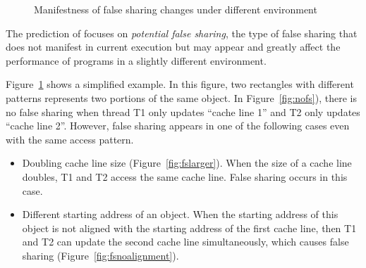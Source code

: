 \begin{figure}
\begin{center} 
%
\hspace{30pt}
%
\hspace{30pt}
%
\end{center}
\caption{Manifestness of false sharing changes under different environment}
\label{fig:potentialfalsesharing}
\end{figure}
The prediction of  focuses on {\it potential false sharing}, the type of
false sharing that does not 
manifest in current execution but may appear and greatly affect the performance of programs
in a slightly different environment.

Figure~\ref{fig:potentialfalsesharing} shows a simplified example.
In this figure, two rectangles with different patterns
represents two portions of the same object. 
In Figure~\ref{fig:nofs}), there is no false sharing when thread T1 only updates 
``cache line 1'' and T2 only updates ``cache line 2''.
However, false sharing appears in one of the following cases even with the same
access pattern. 

\begin{itemize}
\item
Doubling cache line size (Figure~\ref{fig:fslarger}). When the size of a
cache line doubles,
T1 and T2 access the same cache line. False sharing occurs in this case.

\item
Different starting address of an object. 
When the starting address of this object is not aligned with the starting address of 
the first cache line, 
then T1 and T2 can update the second cache line simultaneously, 
which causes false sharing (Figure~\ref{fig:fsnoalignment}). 
\end{itemize} 

